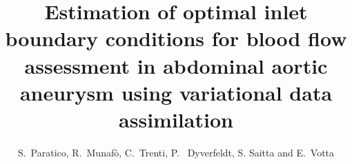 \graphicspath{{chapters/chp1/graphics/}}

\title{Estimation of optimal inlet boundary conditions for blood flow assessment in abdominal aortic aneurysm using variational data assimilation}

\author{S.~Paratico, R.~Munaf\`o, C.~Trenti, P.~ Dyverfeldt, S. Saitta and E.~Votta}

\maketitle

\abstract{}

